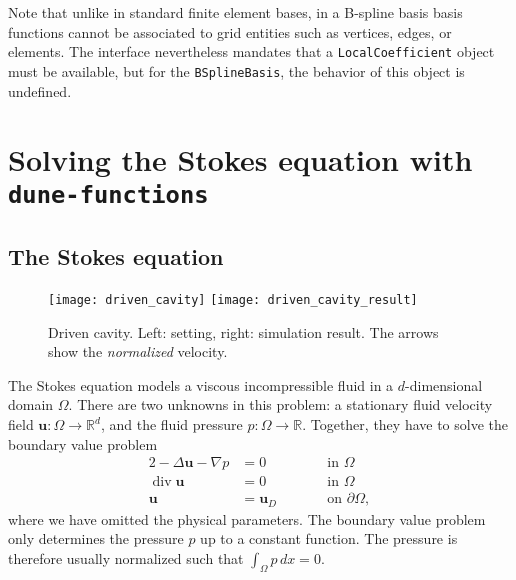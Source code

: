 \documentclass[a4paper,10pt,headings=normal,bibliography=totoc]{scrartcl}
\newcommand{\cpp}[1]{\lstinline[basicstyle=\ttfamily]!#1!}
\newcommand{\R}{\mathbb{R}}
\renewcommand{\div}{\operatorname{div}}
\newcommand{\dunemodule}[1]{\texttt{#1}}
\begin{document}
\begin{itemize}
   Note that unlike in standard finite element bases, in a B-spline basis basis functions cannot be associated
   to grid entities such as vertices, edges, or elements.  The interface nevertheless mandates that a
   \cpp{LocalCoefficient} object must be available, but for the \cpp{BSplineBasis}, the behavior of this
   object is undefined.
\end{itemize}



\section{Solving the Stokes equation with \dunemodule{dune-functions}}
\label{sec:stokes_example}

\subsection{The Stokes equation}

\begin{figure}
 \begin{center}
  \texttt{[image: driven\_cavity]}
  \qquad
  \texttt{[image: driven\_cavity\_result]}
 \end{center}
 \caption{Driven cavity. Left: setting, right: simulation result.  The arrows show the {\em normalized} velocity.}
 \label{fig:dune_functions:driven_cavity}
\end{figure}

The Stokes equation models a viscous incompressible
fluid in a $d$-dimensional domain $\Omega$.  There are two unknowns in this problem: a stationary
fluid velocity field $\mathbf{u} : \Omega \to \R^d$, and the fluid pressure $p : \Omega \to \R$.
Together, they have to solve the boundary value problem
\begin{alignat*}{2}
 -\Delta \mathbf{u} - \nabla p & = 0  & \qquad & \text{in $\Omega$} \\
 \div \mathbf{u} & = 0                &        & \text{in $\Omega$} \\
                    \mathbf{u} & = \mathbf{u}_D  &        & \text{on $\partial \Omega$},
\end{alignat*}
where we have omitted the physical parameters.  The boundary value problem only determines the
pressure $p$ up to a constant function.  The pressure is therefore usually normalized such
that $\int_\Omega p\,dx = 0$.
\end{document}
